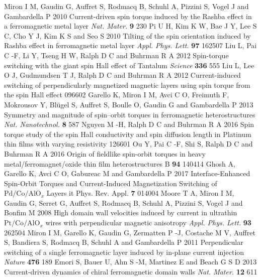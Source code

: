 \documentclass[12pt]{iopart}
\begin{document}
\begin{thebibliography}{99}
 Miron I M, Gaudin G, Auffret S, Rodmacq B, Schuhl A, Pizzini S, Vogel J and Gambardella P 2010 Current-driven spin torque induced by the Rashba effect in a ferromagnetic metal layer {\it Nat. Mater.} {\bf 9} 230
 Pi U H, Kim K W, Bae J Y, Lee S C, Cho Y J, Kim K S and Seo S 2010 Tilting of the spin orientation induced by Rashba effect in ferromagnetic metal layer {\it Appl. Phys. Lett.} {\bf 97} 162507
 Liu L, Pai C -F, Li Y, Tseng H W, Ralph D C and Buhrman R A 2012 Spin-torque switching with the giant spin Hall effect of Tantalum {\it Science} {\bf 336} 555
 Liu L, Lee O J, Gudmundsen T J, Ralph D C and Buhrman R A 2012 Current-induced switching of perpendicularly magnetized magnetic layers using spin torque from the spin Hall effect  096602
 Garello K, Miron I M, Avci C O, Freimuth F, Mokrousov Y, Bl\"{u}gel S, Auffret S, Boulle O, Gaudin G and Gambardella P 2013 Symmetry and magnitude of spin–orbit torques in ferromagnetic heterostructures {\it Nat. Nanotechnol.} {\bf 8} 587
 Nguyen M -H, Ralph D C and Buhrman R A 2016 Spin torque study of the spin Hall conductivity and spin diffusion length in Platinum thin films with varying resistivity  126601
 Ou Y, Pai C -F, Shi S, Ralph D C and Buhrman R A 2016 Origin of fieldlike spin-orbit torques in heavy metal/ferromagnet/oxide thin film heterostructures \PR B {\bf 94} 140414
 Ghosh A, Garello K, Avci C O, Gabureac M and Gambardella P 2017 Interface-Enhanced Spin-Orbit Torques and Current-Induced Magnetization Switching of $\mathrm{Pd}/\mathrm{Co}/{\mathrm{AlO}}_{x}$ Layers {it Phys. Rev. Appl.} {\bf 7} 014004
 Moore T A, Miron I M, Gaudin G, Serret G, Auffret S, Rodmacq B, Schuhl A, Pizzini S, Vogel J and Bonfim M 2008 High domain wall velocities induced by current in ultrathin $\mathrm{Pt}/\mathrm{Co}/{\mathrm{AlO}}_{x}$ wires with perpendicular magnetic anisotropy {\it Appl. Phys. Lett.} {\bf 93} 262504
 Miron I M, Garello K, Gaudin G, Zermatten P -J, Costache M V, Auffret S, Bandiera S, Rodmacq B, Schuhl A and Gambardella P 2011 Perpendicular switching of a single ferromagnetic layer induced by in-plane current injection {\it Nature} {\bf 476} 189
 Emori S, Bauer U, Ahn S -M, Martinez E and Beach G S D 2013 Current-driven dynamics of chiral ferromagnetic domain walls {\it Nat. Mater.} {\bf 12} 611

\end{thebibliography}
\end{document}
